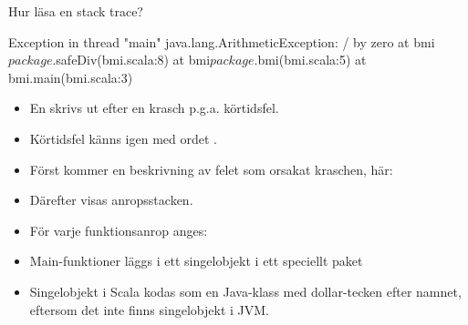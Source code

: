 \begin{Slide}{Hur läsa en stack trace?}
\begin{REPL}
Exception in thread "main" java.lang.ArithmeticException: / by zero
        at bmi$package$.safeDiv(bmi.scala:8)
        at bmi$package$.bmi(bmi.scala:5)
        at bmi.main(bmi.scala:3)

\end{REPL}
\begin{itemize}\SlideFontSmall
  \item En  skrivs ut efter en krasch p.g.a. körtidsfel.
  \item Körtidsfel känns igen med ordet .
  \item Först kommer en beskrivning av felet som orsakat kraschen, här: \\ 
  \item Därefter visas anropsstacken.
  \item För varje funktionsanrop anges: 
  \item Main-funktioner läggs i ett singelobjekt i ett speciellt paket
  \item Singelobjekt i Scala kodas som en Java-klass med dollar-tecken efter namnet, eftersom det inte finns singelobjekt i JVM.
\end{itemize}
\end{Slide}
  

